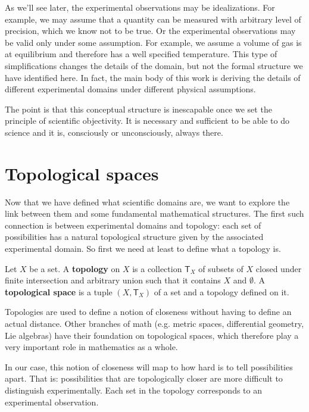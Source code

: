 \documentclass[11pt,letterpaper,fleqn]{memoir} %
\begin{document}
As we'll see later, the experimental observations may be idealizations. For example, we may assume that a quantity can be measured with arbitrary level of precision, which we know not to be true. Or the experimental observations may be valid only under some assumption. For example, we assume a volume of gas is at equilibrium and therefore has a well specified temperature. This type of simplifications changes the details of the domain, but not the formal structure we have identified here. In fact, the main body of this work is deriving the details of different experimental domains under different physical assumptions.

The point is that this conceptual structure is inescapable once we set the principle of scientific objectivity. It is necessary and sufficient to be able to do science and it is, consciously or unconsciously, always there.

\section{Topological spaces}

Now that we have defined what scientific domains are, we want to explore the link between them and some fundamental mathematical structures. The first such connection is between experimental domains and topology: each set of possibilities has a natural topological structure given by the associated experimental domain. So first we need at least to define what a topology is.

\begin{mathSection}
	\begin{defn}
		Let $X$ be a set. A \textbf{topology} on $X$ is a collection $\mathsf{T}_X$ of subsets of $X$ closed under finite intersection and arbitrary union such that it contains $X$ and $\emptyset$. A \textbf{topological space} is a tuple $(X, \mathsf{T}_X)$ of a set and a topology defined on it.
	\end{defn}
\end{mathSection}

Topologies are used to define a notion of closeness without having to define an actual distance. Other branches of math (e.g. metric spaces, differential geometry, Lie algebras) have their foundation on topological spaces, which therefore play a very important role in mathematics as a whole.

In our case, this notion of closeness will map to how hard is to tell possibilities apart. That is: possibilities that are topologically closer are more difficult to distinguish experimentally. Each set in the topology corresponds to an experimental observation.
\end{document}
